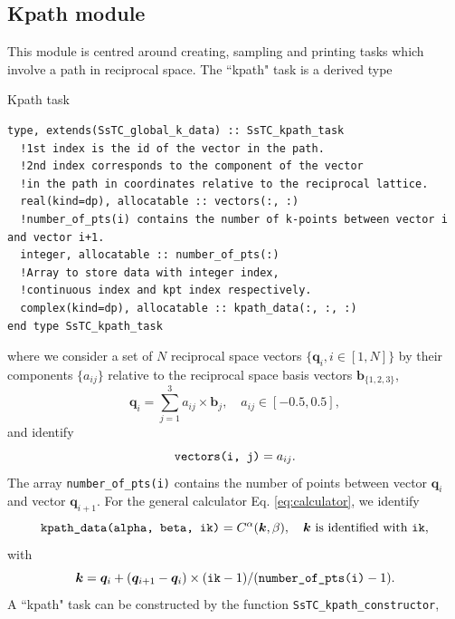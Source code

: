 \documentclass[10pt,a4paper]{article}
\begin{document}
\subsection{Kpath module}
This module is centred around creating, sampling and printing tasks which involve a path in reciprocal space. The ``kpath" task is a derived type
\begin{codebox}{Kpath task}
\begin{lstlisting}[caption={Derived type corresponding to a ``kpath" task.},captionpos=b]
type, extends(SsTC_global_k_data) :: SsTC_kpath_task
  !1st index is the id of the vector in the path.
  !2nd index corresponds to the component of the vector
  !in the path in coordinates relative to the reciprocal lattice.
  real(kind=dp), allocatable :: vectors(:, :)
  !number_of_pts(i) contains the number of k-points between vector i and vector i+1.
  integer, allocatable :: number_of_pts(:)
  !Array to store data with integer index,
  !continuous index and kpt index respectively.
  complex(kind=dp), allocatable :: kpath_data(:, :, :)
end type SsTC_kpath_task
\end{lstlisting}
\end{codebox}
where we consider a set of $N$ reciprocal space vectors $\{\bm{q}_i, i\in[1, N]\}$ by their components $\{a_{ij}\}$ relative to the reciprocal space basis vectors $\bm{b}_{\{1, 2, 3\}}$,
\begin{equation}\label{eq:vec_coords_path}
\bm{q}_i = \sum_{j=1}^3 a_{ij}\times \bm{b}_j, \quad a_{ij}\in\left[-0.5, 0.5\right],
\end{equation}
and identify
\begin{equation}
\verb|vectors(i, j)| = a_{ij}.
\end{equation}
The array \verb|number_of_pts(i)| contains the number of points between vector $\bm{q}_i$ and vector $\bm{q}_{i+1}$. For the general calculator Eq. \eqref{eq:calculator}, we identify
\begin{equation}
\verb|kpath_data(alpha, beta, ik)| = C^{\alpha}(\bm{k},\beta),\quad \bm{k}\text{ is identified with } \verb|ik|,
\end{equation}
with
\begin{equation}
\bm{k} = \bm{q}_i + (\bm{q}_{i+1} - \bm{q}_i)\times (\verb|ik| - 1)/(\verb|number_of_pts(i)| - 1).
\end{equation}
A ``kpath" task can be constructed by the function \verb|SsTC_kpath_constructor|,
\end{document}
